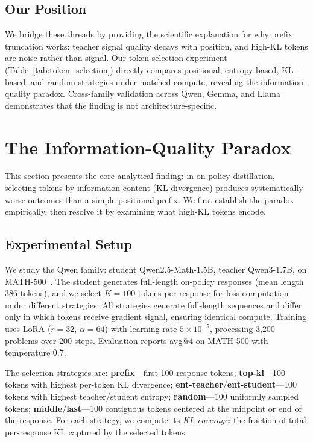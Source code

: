 \subsection{Our Position}

We bridge these threads by providing the scientific explanation for why prefix truncation works: teacher signal quality decays with position, and high-KL tokens are noise rather than signal.
Our token selection experiment (Table~\ref{tab:token_selection}) directly compares positional, entropy-based, KL-based, and random strategies under matched compute, revealing the information-quality paradox.
Cross-family validation across Qwen, Gemma, and Llama demonstrates that the finding is not architecture-specific.


\section{The Information-Quality Paradox}
\label{sec:paradox}

This section presents the core analytical finding: in on-policy distillation, selecting tokens by information content (KL divergence) produces systematically worse outcomes than a simple positional prefix.
We first establish the paradox empirically, then resolve it by examining what high-KL tokens encode.

\subsection{Experimental Setup}
\label{sec:paradox_setup}

We study the Qwen family: student Qwen2.5-Math-1.5B, teacher Qwen3-1.7B, on MATH-500~\citep{hendrycks2021math}.
The student generates full-length on-policy responses (mean length 386 tokens), and we select $K{=}100$ tokens per response for loss computation under different strategies.
All strategies generate full-length sequences and differ only in which tokens receive gradient signal, ensuring identical compute.
Training uses LoRA ($r{=}32$, $\alpha{=}64$) with learning rate $5{\times}10^{-5}$, processing 3{,}200 problems over 200 steps.
Evaluation reports avg@4 on MATH-500 with temperature 0.7.

The selection strategies are:
\textbf{prefix}---first 100 response tokens;
\textbf{top-kl}---100 tokens with highest per-token KL divergence;
\textbf{ent-teacher}/\textbf{ent-student}---100 tokens with highest teacher/student entropy;
\textbf{random}---100 uniformly sampled tokens;
\textbf{middle}/\textbf{last}---100 contiguous tokens centered at the midpoint or end of the response.
For each strategy, we compute its \emph{KL coverage}: the fraction of total per-response KL captured by the selected tokens.

